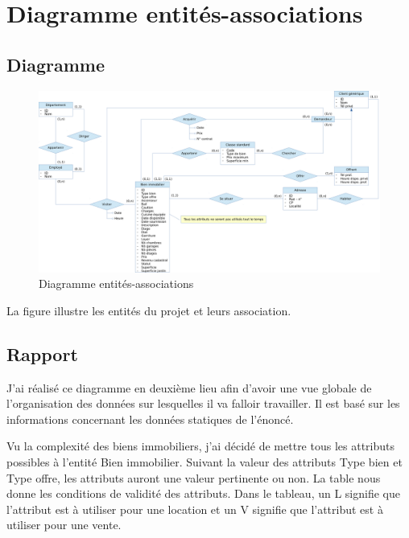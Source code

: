 \chapter{Diagramme entités-associations}

\section{Diagramme}

\begin{figure}
  \centering
  \includegraphics[angle=90,height=0.99\textheight]{IMG/er}
  \caption{Diagramme entités-associations}
  \label{img_er}
\end{figure}

La figure  illustre les entités du projet et leurs association.

\section{Rapport}

J'ai réalisé ce diagramme en deuxième lieu afin d'avoir une vue globale de l'organisation des données sur lesquelles il va falloir travailler. Il est basé sur les informations concernant les données statiques de l'énoncé.

Vu la complexité des biens immobiliers, j'ai décidé de mettre tous les attributs possibles à l'entité \og{}Bien immobilier\fg{}. Suivant la valeur des attributs \og{}Type bien\fg{} et \og{}Type offre\fg{}, les attributs auront une valeur pertinente ou non. La table  nous donne les conditions de validité des attributs. Dans le tableau, un \og{}L\fg{} signifie que l'attribut est à utiliser pour une location et un \og{}V\fg{} signifie que l'attribut est à utiliser pour une vente.

